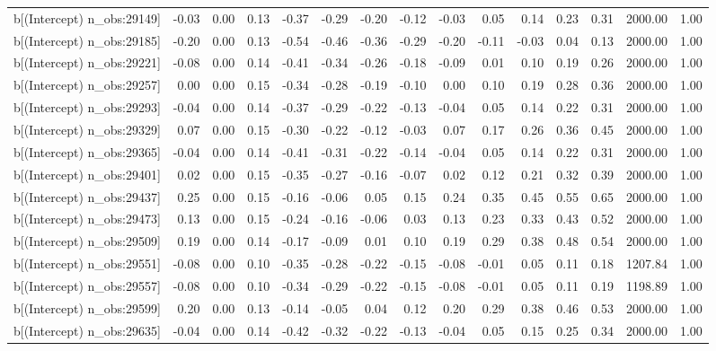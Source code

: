 \begin{table}[ht]
\begin{tabular}{rrrrrrrrrrrrrrr}
  b[(Intercept) n\_obs:29149] & -0.03 & 0.00 & 0.13 & -0.37 & -0.29 & -0.20 & -0.12 & -0.03 & 0.05 & 0.14 & 0.23 & 0.31 & 2000.00 & 1.00 \\ 
  b[(Intercept) n\_obs:29185] & -0.20 & 0.00 & 0.13 & -0.54 & -0.46 & -0.36 & -0.29 & -0.20 & -0.11 & -0.03 & 0.04 & 0.13 & 2000.00 & 1.00 \\ 
  b[(Intercept) n\_obs:29221] & -0.08 & 0.00 & 0.14 & -0.41 & -0.34 & -0.26 & -0.18 & -0.09 & 0.01 & 0.10 & 0.19 & 0.26 & 2000.00 & 1.00 \\ 
  b[(Intercept) n\_obs:29257] & 0.00 & 0.00 & 0.15 & -0.34 & -0.28 & -0.19 & -0.10 & 0.00 & 0.10 & 0.19 & 0.28 & 0.36 & 2000.00 & 1.00 \\ 
  b[(Intercept) n\_obs:29293] & -0.04 & 0.00 & 0.14 & -0.37 & -0.29 & -0.22 & -0.13 & -0.04 & 0.05 & 0.14 & 0.22 & 0.31 & 2000.00 & 1.00 \\ 
  b[(Intercept) n\_obs:29329] & 0.07 & 0.00 & 0.15 & -0.30 & -0.22 & -0.12 & -0.03 & 0.07 & 0.17 & 0.26 & 0.36 & 0.45 & 2000.00 & 1.00 \\ 
  b[(Intercept) n\_obs:29365] & -0.04 & 0.00 & 0.14 & -0.41 & -0.31 & -0.22 & -0.14 & -0.04 & 0.05 & 0.14 & 0.22 & 0.31 & 2000.00 & 1.00 \\ 
  b[(Intercept) n\_obs:29401] & 0.02 & 0.00 & 0.15 & -0.35 & -0.27 & -0.16 & -0.07 & 0.02 & 0.12 & 0.21 & 0.32 & 0.39 & 2000.00 & 1.00 \\ 
  b[(Intercept) n\_obs:29437] & 0.25 & 0.00 & 0.15 & -0.16 & -0.06 & 0.05 & 0.15 & 0.24 & 0.35 & 0.45 & 0.55 & 0.65 & 2000.00 & 1.00 \\ 
  b[(Intercept) n\_obs:29473] & 0.13 & 0.00 & 0.15 & -0.24 & -0.16 & -0.06 & 0.03 & 0.13 & 0.23 & 0.33 & 0.43 & 0.52 & 2000.00 & 1.00 \\ 
  b[(Intercept) n\_obs:29509] & 0.19 & 0.00 & 0.14 & -0.17 & -0.09 & 0.01 & 0.10 & 0.19 & 0.29 & 0.38 & 0.48 & 0.54 & 2000.00 & 1.00 \\ 
  b[(Intercept) n\_obs:29551] & -0.08 & 0.00 & 0.10 & -0.35 & -0.28 & -0.22 & -0.15 & -0.08 & -0.01 & 0.05 & 0.11 & 0.18 & 1207.84 & 1.00 \\ 
  b[(Intercept) n\_obs:29557] & -0.08 & 0.00 & 0.10 & -0.34 & -0.29 & -0.22 & -0.15 & -0.08 & -0.01 & 0.05 & 0.11 & 0.19 & 1198.89 & 1.00 \\ 
  b[(Intercept) n\_obs:29599] & 0.20 & 0.00 & 0.13 & -0.14 & -0.05 & 0.04 & 0.12 & 0.20 & 0.29 & 0.38 & 0.46 & 0.53 & 2000.00 & 1.00 \\ 
  b[(Intercept) n\_obs:29635] & -0.04 & 0.00 & 0.14 & -0.42 & -0.32 & -0.22 & -0.13 & -0.04 & 0.05 & 0.15 & 0.25 & 0.34 & 2000.00 & 1.00 \\ 

\end{tabular}
\end{table}
